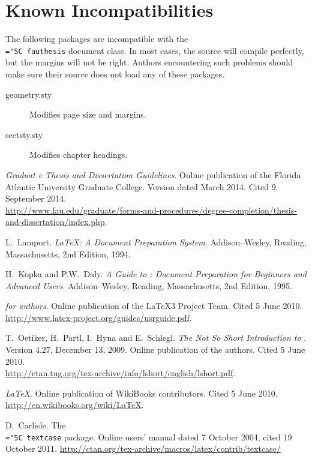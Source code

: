 \documentclass[11pt]{article}
\newcommand\guide{{http://www.fau.edu/graduate/forms-and-procedures/degree-completion/thesis-and-dissertation/index.php}}
\newcommand\code[1]{{\normalfont\texttt{\let\dv\textsl\chardef\\="5C #1}}}
\begin{document}
\section{Known Incompatibilities}\label{incomp}

The following packages are incompatible with the \code{fauthesis} document class.  In most cases, the source will compile perfectly, but the margins will not be right.  Authors encountering such problems should make sure their source does not load any of these packages.

\begin{description}
\item[geometry.sty] Modifies page size and margins.
\item[sectsty.sty] Modifies chapter headings.
\end{description}



\begin{thebibliography}{M}

\textit{Graduat	e Thesis and Dissertation Guidelines}.
Online publication of the Florida Atlantic University Graduate College.
Version dated March 2014.
Cited 9 September 2014.\\
\expandafter\url\guide.

L.~Lamport.
\textit{\LaTeX: A Document Preparation System}.
Addison--Wesley, Reading, Massachusetts, 2nd Edition, 1994.

H.~Kopka and P.W.~Daly.
\textit{A Guide to \LaTeXe: Document Preparation for Beginners and Advanced Users}.
Addison--Wesley, Reading, Massachusetts, 2nd Edition, 1995.

\textit{\LaTeXe for authors}.
Online publication of the \LaTeX3 Project Team.
Cited 5 June 2010.\\
\url{http://www.latex-project.org/guides/usrguide.pdf}.

T.~Oetiker, H.~Partl, I.~Hyna and E.~Schlegl.
\textit{The Not So Short Introduction to \LaTeXe}.
Version 4.27, December 13, 2009.
Online publication of the authors.
Cited 5 June 2010.\\
\url{http://ctan.tug.org/tex-archive/info/lshort/english/lshort.pdf}.

\textit{\LaTeX}.
Online publication of WikiBooks contributors.
Cited 5 June 2010.\\
\url{http://en.wikibooks.org/wiki/LaTeX}.

D.~Carlisle.
The \code{textcase} package.
Online users' manual dated 7 October 2004, cited 19 October 2011.
\url{http://ctan.org/tex-archive/macros/latex/contrib/textcase/}
\end{thebibliography}
\end{document}
